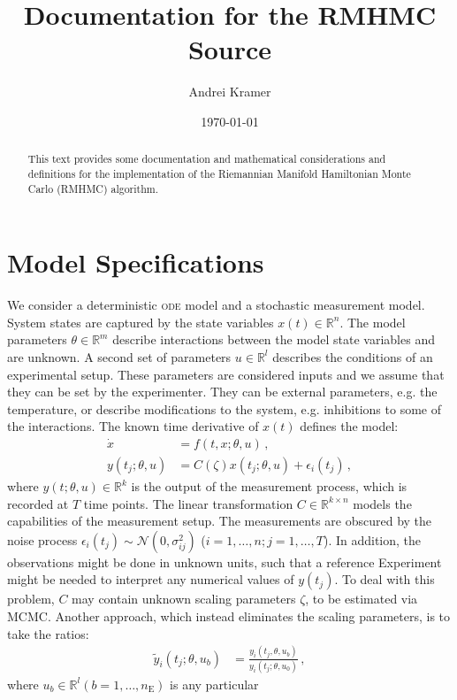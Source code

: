 \documentclass[utf8,english]{scrartcl}
\title{Documentation for the RMHMC Source}
\author{Andrei Kramer}
\date{\today}
\newcommand{\ode}{\textsc{ode}}
\begin{document}
\maketitle
\begin{abstract}
  This text provides some documentation and mathematical
  considerations and definitions for the implementation of the
  Riemannian Manifold Hamiltonian Monte Carlo (RMHMC) algorithm.
\end{abstract}

\section{Model Specifications}
\label{sec:odeModel}

We consider a deterministic \ode{} model and a stochastic measurement
model. System states are captured by the state variables
$x(t)\in\mathbb{R}^n$. The model parameters $\theta\in\mathbb{R}^m$
describe interactions between the model state variables and are
unknown. A second set of parameters $u\in\mathbb{R}^l$ describes the
conditions of an experimental setup. These parameters are considered
inputs and we assume that they can be set by the experimenter. They
can be external parameters, e.g. the temperature, or describe
modifications to the system, e.g. inhibitions to some of the
interactions. The known time derivative of $x(t)$ defines the model:
\begin{align}
  \dot x &= f(t,x;\theta,u)\,,\\
  y(t_j;\theta,u)&=C(\zeta) x(t_j;\theta,u) + \epsilon_i(t_j)\,,
\end{align}
where $y(t;\theta,u)\in\mathbb{R}^k$ is the output of the measurement process,
which is recorded at $T$ time points. The linear transformation
$C\in\mathbb{R}^{k\times n}$ models the capabilities of the
measurement setup. The measurements are obscured by the noise process
$\epsilon_i(t_j)\sim\mathcal{N}(0,\sigma^2_{ij})$ ($i=1,\dots,n;
j=1,\dots,T$). In addition, the observations might be done in unknown
units, such that a reference Experiment might be needed to interpret
any numerical values of $y(t_j)$. To deal with this problem, $C$ may
contain unknown scaling parameters $\zeta$, to be estimated via MCMC. Another
approach, which instead eliminates the scaling parameters, is to take
the ratios:
\begin{align}
  \tilde y_i(t_j;\theta,u_b) &= \frac{y_i(t_j,\theta,u_b)}{y_i(t_j;\theta,u_0)}\,,
\end{align}
where $u_b\in\mathbb{R}^l (b=1,\dots,n_{\text{E}})$ is any particular
\end{document}
